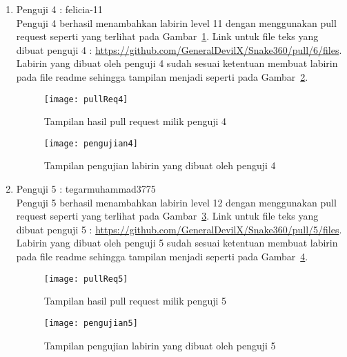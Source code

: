 \begin{enumerate}
	\item Penguji 4 : felicia-11\\
	Penguji 4 berhasil menambahkan labirin level 11 dengan menggunakan pull request seperti yang terlihat pada Gambar~\ref{fig:pullReq4}. Link untuk file teks yang dibuat penguji 4 : \url{https://github.com/GeneralDevilX/Snake360/pull/6/files}. Labirin yang dibuat oleh penguji 4 sudah sesuai ketentuan membuat labirin pada file readme sehingga tampilan menjadi seperti pada Gambar~\ref{fig:pengujian4}.
	
	\begin{figure}[H]
		\centering  
		\texttt{[image: pullReq4]}  
		\caption[Tampilan hasil pull request milik penguji 4]{Tampilan hasil pull request milik penguji 4}
		\label{fig:pullReq4} 
	\end{figure}
	
	\begin{figure}[H]
		\centering  
		\texttt{[image: pengujian4]}  
		\caption[Tampilan pengujian labirin yang dibuat oleh penguji 4]{Tampilan pengujian labirin yang dibuat oleh penguji 4}
		\label{fig:pengujian4} 
	\end{figure}
	
	\item Penguji 5 : tegarmuhammad3775\\
	Penguji 5 berhasil menambahkan labirin level 12 dengan menggunakan pull request seperti yang terlihat pada Gambar~\ref{fig:pullReq5}. Link untuk file teks yang dibuat penguji 5 : \url{https://github.com/GeneralDevilX/Snake360/pull/5/files}. Labirin yang dibuat oleh penguji 5 sudah sesuai ketentuan membuat labirin pada file readme sehingga tampilan menjadi seperti pada Gambar~\ref{fig:pengujian5}.
	
	\begin{figure}[H]
		\centering  
		\texttt{[image: pullReq5]}  
		\caption[Tampilan hasil pull request milik penguji 5]{Tampilan hasil pull request milik penguji 5}
		\label{fig:pullReq5} 
	\end{figure}
	
	\begin{figure}[H]
		\centering  
		\texttt{[image: pengujian5]}  
		\caption[Tampilan pengujian labirin yang dibuat oleh penguji 5]{Tampilan pengujian labirin yang dibuat oleh penguji 5}
		\label{fig:pengujian5} 
	\end{figure}
\end{enumerate}